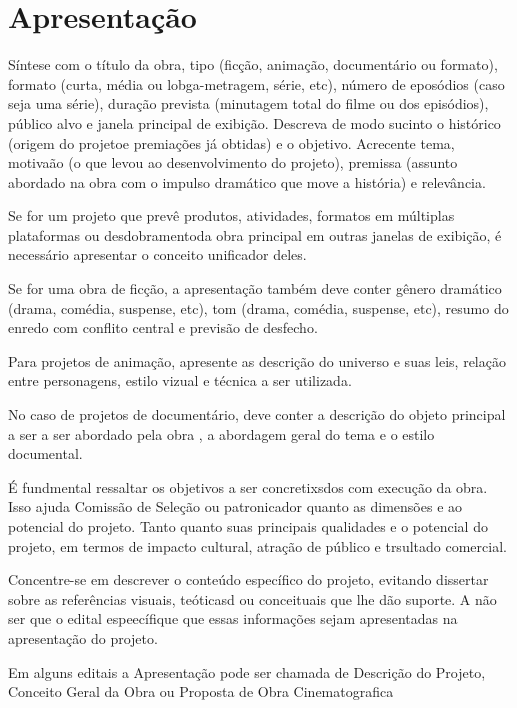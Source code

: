 \chapter{Apresentação}

Síntese com o título da obra, tipo (ficção, animação, documentário ou formato), formato (curta, média ou lobga-metragem, série, etc), número de eposódios (caso seja uma série), duração prevista (minutagem total do filme ou dos episódios), público alvo e janela principal de exibição. Descreva de modo sucinto o histórico (origem do projetoe premiações já obtidas) e o objetivo. Acrecente tema, motivaão (o que levou ao desenvolvimento do projeto), premissa (assunto abordado na obra com o impulso dramático que move a história) e relevância.

Se for um projeto que prevê produtos, atividades, formatos em múltiplas plataformas ou desdobramentoda obra principal em outras janelas de exibição, é necessário apresentar o conceito unificador deles.

Se for uma obra de ficção, a apresentação também deve conter gênero dramático (drama, comédia, suspense, etc), tom (drama, comédia, suspense, etc), resumo do enredo com conflito central e previsão de desfecho.

Para projetos de animação, apresente as descrição do universo e suas leis, relação entre personagens, estilo vizual e técnica a ser utilizada.

No caso de projetos de documentário, deve conter a descrição do objeto principal a ser a ser abordado pela obra , a abordagem geral do tema e o estilo documental.

É fundmental ressaltar os objetivos a ser concretixsdos com execução da obra. Isso ajuda Comissão de Seleção ou patronicador quanto as dimensões e ao potencial do projeto. Tanto quanto suas principais qualidades e o potencial do projeto, em termos de impacto cultural, atração de público e trsultado comercial.

Concentre-se em descrever o conteúdo específico do projeto, evitando dissertar sobre as referências visuais, teóticasd ou conceituais que lhe dão suporte. A não ser que o edital espeecífique que essas informações sejam apresentadas na apresentação do projeto.

Em alguns editais a Apresentação pode ser chamada de  Descrição do Projeto, Conceito Geral da Obra ou Proposta de Obra Cinematografica

